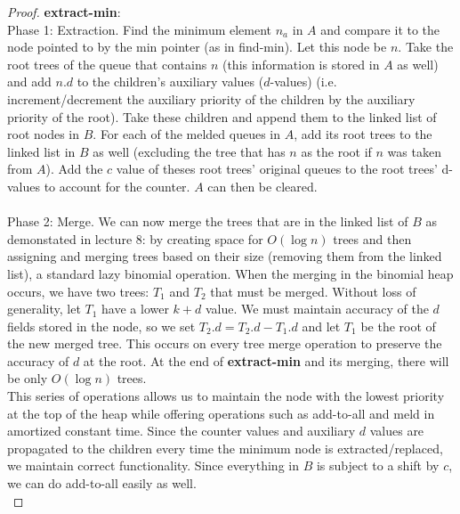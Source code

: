\documentclass{article}
\theoremstyle{casestyle}
\begin{document}
\begin{proof}
  \textbf{extract-min}: \\ Phase 1: Extraction. Find the minimum element $n_a$ in $A$ and compare it to the node pointed to by the min pointer (as in find-min). Let this node be $n$. Take the root trees of the queue that contains $n$ (this information is stored in $A$ as well) and add $n.d$ to the children's auxiliary values ($d$-values) (i.e. increment/decrement the auxiliary priority of the children by the auxiliary priority of the root). Take these children and append them to the linked list of root nodes in $B$. For each of the melded queues in $A$, add its root trees to the linked list in $B$ as well (excluding the tree that has $n$ as the root if $n$ was taken from $A$). Add the $c$ value of theses root trees' original queues to the root trees' d-values to account for the counter. $A$ can then be cleared. \\\\ Phase 2: Merge. We can now merge the trees that are in the linked list of $B$ as demonstated in lecture 8: by creating space for $O(\log n)$ trees and then assigning and merging trees based on their size (removing them from the linked list), a standard lazy binomial operation. When the merging in the binomial heap occurs, we have two trees: $T_1$ and $T_2$ that must be merged. Without loss of generality, let $T_1$ have a lower $k+d$ value. We must maintain accuracy of the $d$ fields stored in the node, so we set $T_2.d = T_2.d - T_1.d$ and let $T_1$ be the root of the new merged tree. This occurs on every tree merge operation to preserve the accuracy of $d$ at the root. At the end of \textbf{extract-min} and its merging, there will be only $O(\log n)$ trees.\\

  This series of operations allows us to maintain the node with the lowest priority at the top of the heap while offering operations such as add-to-all and meld in amortized constant time. Since the counter values and auxiliary $d$ values are propagated to the children every time the minimum node is extracted/replaced, we maintain correct functionality. Since everything in $B$ is subject to a shift by $c$, we can do add-to-all easily as well. \\


\end{proof}
\end{document}
